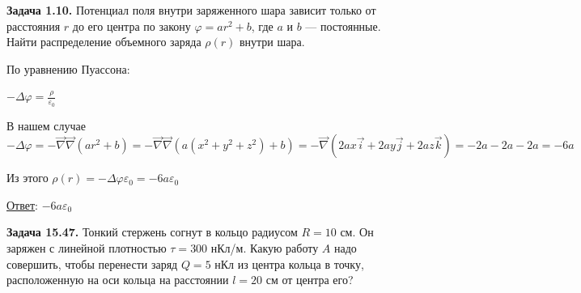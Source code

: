\begin{tcolorbox}
    \textbf{Задача 1.10.} Потенциал поля внутри заряженного шара зависит только от
    расстояния $r$ до его центра по закону $\varphi = ar^2 + b$, где $a$ и $b$ — постоянные. 
    Найти распределение объемного заряда $\rho(r)$ внутри
    шара.
\end{tcolorbox}

\begin{minipage}{\textwidth}
    \begin{figure}
    \end{figure}

    По уравнению Пуассона:

    $-\Delta \varphi = \frac{\rho}{\varepsilon_0}$

    В нашем случае $-\Delta \varphi = -\vec\nabla\vec\nabla(ar^2 + b) = -\vec\nabla\vec\nabla(a(x^2 + y^2 + z^2) + b) = 
    -\vec\nabla\left(2ax\vec{i} + 2ay\vec{j} + 2az\vec{k}\right) = -2a - 2a - 2a = -6a$

    Из этого $\rho(r) = -\Delta \varphi \varepsilon_0 = -6a\varepsilon_0$
\end{minipage}

\bigvspace

\underline{Ответ}: $-6a\varepsilon_0$


\begin{tcolorbox}
    \textbf{Задача 15.47.} Тонкий стержень согнут в кольцо радиусом $R = 10$ см.
    Он заряжен с линейной плотностью $\tau = 300$ нКл/м. Какую работу
    $A$ надо совершить, чтобы перенести заряд $Q = 5$ нКл из центра кольца в точку,
    расположенную на оси кольца на расстоянии $l = 20$ см от центра его?
\end{tcolorbox}


